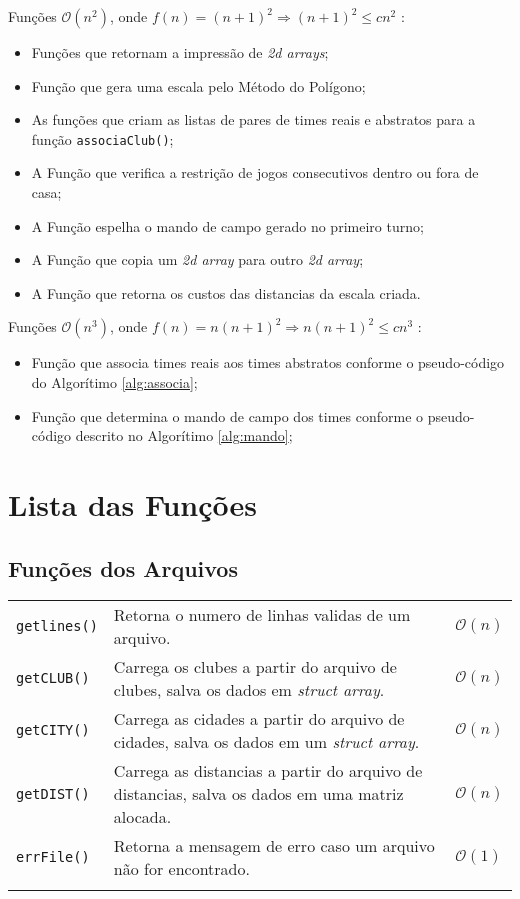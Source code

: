 \documentclass[12pt,a4paper]{article}
\numberwithin{figure}{section}
\numberwithin{table}{section}
\begin{document}
Funções $\mathcal{O}(n^2)$, onde $f(n) = (n+1)^2 \Rightarrow (n+1)^2 \leqslant cn^2$ :

\begin{itemize}
	\setlength\itemsep{1pt}
	\item Funções que retornam a impressão de \textit{2d arrays}; 
	\item Função que gera uma escala pelo Método do Polígono;
	\item As funções que criam as listas de pares de times reais e abstratos para a função \texttt{associaClub()};
	\item A Função que verifica a restrição de jogos consecutivos dentro ou fora de casa;
	\item A Função espelha o mando de campo gerado no primeiro turno;
	\item A Função que copia um \textit{2d array} para outro \textit{2d array};
	\item A Função que retorna os custos das distancias da escala criada.
\end{itemize}

Funções $\mathcal{O}(n^3)$, onde $f(n) = n(n+1)^2 \Rightarrow n(n+1)^2 \leqslant cn^3$ :

\begin{itemize}
	\setlength\itemsep{1pt}
	\item Função que associa times reais aos times abstratos conforme o pseudo-código do Algorítimo \ref{alg:associa}; 
	\item Função que determina o mando de campo dos times conforme o pseudo-código descrito no Algorítimo \ref{alg:mando};
\end{itemize}

\section{Lista das Funções}

\subsection{Funções dos Arquivos}

\begin{longtable}{p{3cm} p{11cm} p{1cm}}
	\texttt{getlines()} & Retorna o numero de linhas validas de um arquivo. & $\mathcal{O}(n)$ \\
	\texttt{getCLUB()} & Carrega os clubes a partir do arquivo de clubes, salva os dados em \textit{struct array}. & $\mathcal{O}(n)$ \\
	\texttt{getCITY()} & Carrega as cidades a partir do arquivo de cidades, salva os dados em um \textit{struct array}. & $\mathcal{O}(n)$ \\
	\texttt{getDIST()} & Carrega as distancias a partir do arquivo de distancias, salva os dados em uma matriz alocada. & $\mathcal{O}(n)$ \\
	\texttt{errFile()} & Retorna a mensagem de erro caso um arquivo não for encontrado. & $\mathcal{O}(1)$ \\
	\label{tab:files}
\end{longtable}
\vspace{-0.5cm}
\end{document}
